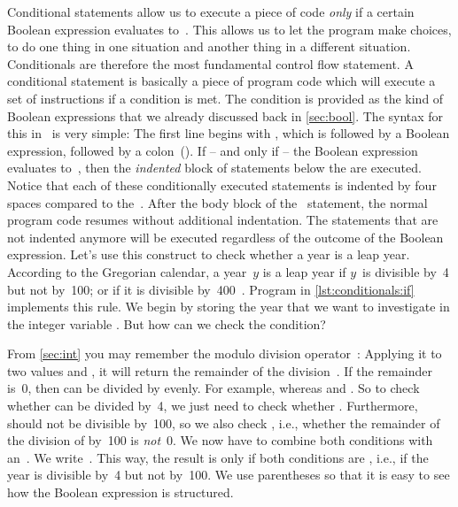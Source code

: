 %
%
Conditional statements allow us to execute a piece of code \emph{only} if a certain Boolean expression evaluates to~.
This allows us to let the program make choices, to do one thing in one situation and another thing in a different situation.
Conditionals are therefore the most fundamental control flow statement.%
%
%
%
A conditional statement is basically a piece of program code which will execute a set of instructions if a condition is met.
The condition is provided as the kind of Boolean expressions that we already discussed back in \cref{sec:bool}.
The syntax for this in \python\ is very simple\cite{PSF:P3D:TPT:MCFT}:%
%
%
%
\FloatBarrier%
%
%
%
%
The first line begins with , which is followed by a Boolean expression, followed by a colon~(\pythonilIdx{:}).
If -- and only if -- the Boolean expression evaluates to~, then the \emph{indented} block of statements below the  are executed.
Notice that each of these conditionally executed statements is indented by four spaces compared to the~.
After the body block of the ~statement, the normal program code resumes without additional indentation.
The statements that are not indented anymore will be executed regardless of the outcome of the Boolean expression.%
%
%
%
Let's use this construct to check whether a year is a leap year.
According to the Gregorian calendar, a year~$y$ is a leap year if $y$~is divisible by~4 but not by~100; or if it is divisible by~400~\cite{EOEBEB:LR}.
Program  in \cref{lst:conditionals:if} implements this rule.
We begin by storing the year that we want to investigate in the integer variable .
But how can we check the condition?

From \cref{sec:int} you may remember the modulo division operator~\pythonilIdx{\%}:
Applying it to two values  and , it will return the remainder of the division~\pythonIdx{//}.
If the remainder is~0, then  can be divided by  evenly.
For example,  whereas  and .
So to check whether  can be divided by~4, we just need to check whether .
Furthermore,  should not be divisible by~100, so we also check , i.e., whether the remainder of the division of  by~100 is \emph{not}~0.
We now have to combine both conditions with an~.
We write~.
This way, the result is only  if both conditions are , i.e., if the year is divisible by~4 but not by~100.
We use parentheses so that it is easy to see how the Boolean expression is structured.

